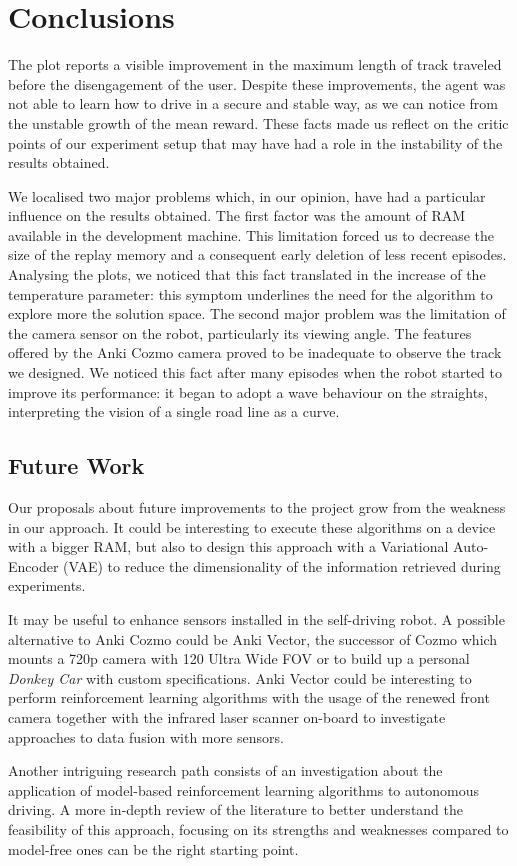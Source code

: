 \documentclass[10pt,twocolumn,letterpaper]{article}
\begin{document}
\section{Conclusions}

The plot reports a visible improvement in the maximum length of track traveled before the disengagement of the user.
Despite these improvements, the agent was not able to learn how to drive in a secure and stable way, as we can notice from the unstable growth of the mean reward.
These facts made us reflect on the critic points of our experiment setup that may have had a role in the instability of the results obtained.

We localised two major problems which, in our opinion, have had a particular influence on the results obtained.
The first factor was the amount of RAM available in the development machine. This limitation forced us to decrease the size of the replay memory and a consequent early deletion of less recent episodes. Analysing the plots, we noticed that this fact translated in the increase of the temperature parameter: this symptom underlines the need for the algorithm to explore more the solution space.
The second major problem was the limitation of the camera sensor on the robot, particularly its viewing angle. The features offered by the Anki Cozmo camera proved to be inadequate to observe the track we designed.
We noticed this fact after many episodes when the robot started to improve its performance: it began to adopt a wave behaviour on the straights, interpreting the vision of a single road line as a curve.

\subsection{Future Work}

Our proposals about future improvements to the project grow from the weakness in our approach.
It could be interesting to execute these algorithms on a device with a bigger RAM, but also to design this approach with a Variational Auto-Encoder (VAE) to reduce the dimensionality of the information retrieved during experiments.

It may be useful to enhance sensors installed in the self-driving robot.
A possible alternative to Anki Cozmo could be Anki Vector, the successor of Cozmo which mounts a 720p camera with 120 Ultra Wide FOV or to build up a personal \textit{Donkey Car} with custom specifications.
Anki Vector could be interesting to perform reinforcement learning algorithms with the usage of the renewed front camera together with the infrared laser scanner on-board to investigate approaches to data fusion with more sensors.

Another intriguing research path consists of an investigation about the application of model-based reinforcement learning algorithms to autonomous driving.
A more in-depth review of the literature to better understand the feasibility of this approach, focusing on its strengths and weaknesses compared to model-free ones can be the right starting point.

{\footnotesize
    
    
}
\end{document}
